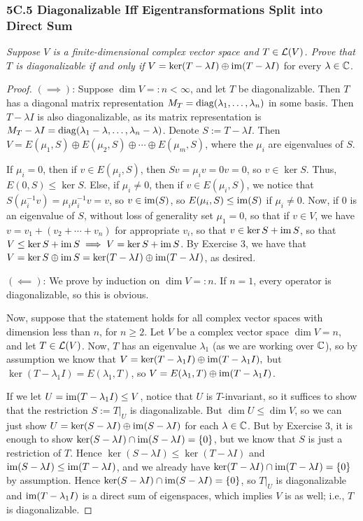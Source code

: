 \documentclass{article}
\begin{document}
\subsubsection*{5C.5 Diagonalizable Iff Eigentransformations Split into Direct Sum}
\textit{Suppose $V$ is a finite-dimensional complex vector space and $T\in\mathcal L(V)$. Prove that $T$ is diagonalizable if and only if} $V = \ker(T-\lambda I)\oplus \operatorname{im}(T-\lambda I)$ for every $\lambda\in\mathbb C$.
\begin{proof}
$(\implies)$: Suppose $\dim V =: n < \infty$, and let $T$ be diagonalizable. Then $T$ has a diagonal matrix representation $M_T = \operatorname{diag}(\lambda_1, \ldots, \lambda_n)$ in some basis. Then $T - \lambda I$ is also diagonalizable, as its matrix representation is $M_T - \lambda I = \operatorname{diag}(\lambda_1 - \lambda, \ldots, \lambda_n -\lambda)$. Denote $S := T-\lambda I$. Then $V = E(\mu_1, S) \oplus E(\mu_2, S) \oplus \cdots \oplus E(\mu_m, S)$, where the $\mu_i$ are eigenvalues of $S$.

If $\mu_i = 0$, then if $v\in E(\mu_i, S)$, then $Sv = \mu_iv = 0v = 0$, so $v\in \ker S$. Thus, $E(0, S) \leq \ker S$. Else, if $\mu_i\neq 0$, then if $v\in E(\mu_i, S)$, we notice that $S(\mu_i^{-1}v) = \mu_i\mu_i^{-1}v = v$, so $v\in \operatorname{im}(S)$, so $E(\mu_i, S) \leq \operatorname{im}(S)$ if $\mu_i\neq 0$. Now, if $0$ is an eigenvalue of $S$, without loss of generality set $\mu_1 = 0$, so that if $v\in V$, we have $v = v_1 + (v_2 + \cdots + v_n)$ for appropriate $v_i$, so that $v\in \ker S + \operatorname{im} S$, so that $V \leq \ker S + \operatorname{im} S \implies V = \ker S + \operatorname{im} S$. By Exercise 3, we have that $V = \ker S \oplus \operatorname{im} S = \ker(T-\lambda I) \oplus \operatorname{im}(T - \lambda I)$, as desired.

$(\impliedby)$: We prove by induction on $\dim V =: n$. If $n = 1$, every operator is diagonalizable, so this is obvious. 

Now, suppose that the statement holds for all complex vector spaces with dimension less than $n$, for $n\geq 2$. Let $V$ be a complex vector space $\dim V = n$, and let $T \in \mathcal L(V)$. Now, $T$ has an eigenvalue $\lambda_1$ (as we are working over $\mathbb C$), so by assumption we know that $V = \ker(T -\lambda_1 I) \oplus \operatorname{im}(T - \lambda_1I),$ but $\ker(T-\lambda_1I) = E(\lambda_1, T)$, so $V = E(\lambda_1, T) \oplus \operatorname{im}(T - \lambda_1I)$.

If we let $U = \operatorname{im}(T - \lambda_1 I) \leq V$, notice that $U$ is $T$-invariant, so it suffices to show that the restriction $S:= T|_U$ is diagonalizable. But $\dim U \leq \dim V$, so we can just show $U = \ker(S - \lambda I) \oplus \operatorname{im}(S - \lambda I)$ for each $\lambda\in \mathbb C$. But by Exercise 3, it is enough to show $\ker(S - \lambda I) \cap \operatorname{im}(S - \lambda I) = \{0\}$, but we know that $S$ is just a restriction of $T$. Hence $\ker(S - \lambda I)\leq \ker(T -\lambda I)$ and $\operatorname{im}(S - \lambda I) \leq \operatorname{im}(T-\lambda I)$, and we already have $\ker(T - \lambda I) \cap \operatorname{im}(T - \lambda I) = \{0\}$ by assumption. Hence $\ker(S - \lambda I)\cap \operatorname{im}(S - \lambda I) = \{0\}$, so $T|_U$ is diagonalizable and $\operatorname{im}(T-\lambda_1I)$ is a direct sum of eigenspaces, which implies $V$ is as well; i.e., $T$ is diagonalizable.
\end{proof}
\end{document}
